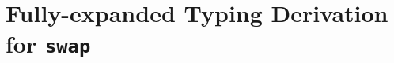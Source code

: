\documentclass[a4paper,UKenglish]{lipics-v2016}
\begin{document}





\appendix

\section{Fully-expanded Typing Derivation for \texttt{swap}}

\end{document}
